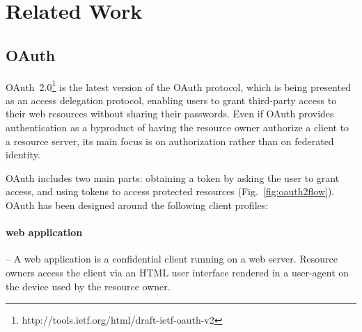 \documentclass[a4paper]{llncs}
\begin{document}






\section{Related Work}\label{sec:relatedwork}

\subsection{OAuth}

OAuth~2.0\footnote{http://tools.ietf.org/html/draft-ietf-oauth-v2} is the latest version of the OAuth protocol, which is being presented as an access delegation protocol, enabling users to grant third-party access to their web resources without sharing their passwords. Even if OAuth provides authentication as a byproduct of having the resource owner authorize a client to a resource server, its main focus is on authorization rather than on federated identity.


OAuth includes two main parts: obtaining a token by asking the user to grant access, and using tokens to access protected resources (Fig.~\ref{fig:oauth2flow}). OAuth has been designed around the following client profiles:

\paragraph*{web application} -- A web application is a confidential client running on a web server. Resource owners access the client via an HTML user interface rendered in a user-agent on the device used by the resource owner.
\end{document}
